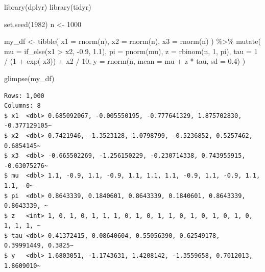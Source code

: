 \documentclass[
  letterpaper,
  DIV=11,
  numbers=noendperiod]{scrreprt}
\newenvironment{Shaded}{\begin{snugshade}}{\end{snugshade}}
\newcommand{\AttributeTok}[1]{\textcolor[rgb]{0.40,0.45,0.13}{#1}}
\newcommand{\DecValTok}[1]{\textcolor[rgb]{0.68,0.00,0.00}{#1}}
\newcommand{\FloatTok}[1]{\textcolor[rgb]{0.68,0.00,0.00}{#1}}
\newcommand{\FunctionTok}[1]{\textcolor[rgb]{0.28,0.35,0.67}{#1}}
\newcommand{\NormalTok}[1]{\textcolor[rgb]{0.00,0.23,0.31}{#1}}
\newcommand{\OtherTok}[1]{\textcolor[rgb]{0.00,0.23,0.31}{#1}}
\newcommand{\SpecialCharTok}[1]{\textcolor[rgb]{0.37,0.37,0.37}{#1}}
\begin{document}
\begin{Shaded}
\begin{Highlighting}[]
\FunctionTok{library}\NormalTok{(dplyr)}
\FunctionTok{library}\NormalTok{(tidyr)}

\FunctionTok{set.seed}\NormalTok{(}\DecValTok{1982}\NormalTok{)}
\NormalTok{n }\OtherTok{\textless{}{-}} \DecValTok{1000} 

\NormalTok{my\_df }\OtherTok{\textless{}{-}} \FunctionTok{tibble}\NormalTok{(}
    \AttributeTok{x1 =} \FunctionTok{rnorm}\NormalTok{(n), }
    \AttributeTok{x2 =} \FunctionTok{rnorm}\NormalTok{(n), }
    \AttributeTok{x3 =} \FunctionTok{rnorm}\NormalTok{(n)}
\NormalTok{  ) }\SpecialCharTok{\%\textgreater{}\%}
  \FunctionTok{mutate}\NormalTok{(}
    \AttributeTok{mu =} \FunctionTok{if\_else}\NormalTok{(x1 }\SpecialCharTok{\textgreater{}}\NormalTok{ x2, }\SpecialCharTok{{-}}\FloatTok{0.9}\NormalTok{, }\FloatTok{1.1}\NormalTok{),}
    \AttributeTok{pi =} \FunctionTok{pnorm}\NormalTok{(mu),}
    \AttributeTok{z =} \FunctionTok{rbinom}\NormalTok{(n, }\DecValTok{1}\NormalTok{, pi),}
    \AttributeTok{tau =} \DecValTok{1} \SpecialCharTok{/}\NormalTok{ (}\DecValTok{1} \SpecialCharTok{+} \FunctionTok{exp}\NormalTok{(}\SpecialCharTok{{-}}\NormalTok{x3)) }\SpecialCharTok{+}\NormalTok{ x2 }\SpecialCharTok{/} \DecValTok{10}\NormalTok{, }
    \AttributeTok{y =} \FunctionTok{rnorm}\NormalTok{(n, }\AttributeTok{mean =}\NormalTok{ mu }\SpecialCharTok{+}\NormalTok{ z }\SpecialCharTok{*}\NormalTok{ tau, }\AttributeTok{sd =} \FloatTok{0.4}\NormalTok{)}
\NormalTok{  )}

\FunctionTok{glimpse}\NormalTok{(my\_df)}
\end{Highlighting}
\end{Shaded}

\begin{verbatim}
Rows: 1,000
Columns: 8
$ x1  <dbl> 0.685092067, -0.005550195, -0.777641329, 1.875702830, -0.377129105~
$ x2  <dbl> 0.7421946, -1.3523128, 1.0798799, -0.5236852, 0.5257462, 0.6854145~
$ x3  <dbl> -0.665502269, -1.256150229, -0.230714338, 0.743955915, -0.63075276~
$ mu  <dbl> 1.1, -0.9, 1.1, -0.9, 1.1, 1.1, 1.1, -0.9, 1.1, -0.9, 1.1, 1.1, -0~
$ pi  <dbl> 0.8643339, 0.1840601, 0.8643339, 0.1840601, 0.8643339, 0.8643339, ~
$ z   <int> 1, 0, 1, 0, 1, 1, 1, 0, 1, 0, 1, 1, 0, 1, 0, 1, 0, 1, 0, 1, 1, 1, ~
$ tau <dbl> 0.41372415, 0.08640604, 0.55056390, 0.62549178, 0.39991449, 0.3825~
$ y   <dbl> 1.6803051, -1.1743631, 1.4208142, -1.3559658, 0.7012013, 1.8609010~
\end{verbatim}
\end{document}
